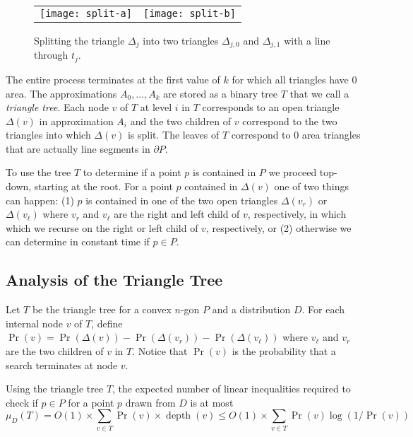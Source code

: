 \documentclass[charterfonts,lotsofwhite]{patmorin}
\newcommand{\boundary}{\partial}
\DeclareMathOperator{\depth}{depth}
\begin{document}
\begin{figure}
\begin{center}
\begin{tabular}{cc}
\texttt{[image: split-a]} & \texttt{[image: split-b]}
\end{tabular}
\end{center}
\caption{Splitting the triangle $\Delta_j$ into two triangles
$\Delta_{j,0}$ and $\Delta_{j,1}$ with a line through $t_j$.}
\end{figure}

The entire process terminates at the first value of $k$ for which all
triangles have 0 area.  The approximations $A_0,\ldots,A_k$ are stored
as a binary tree $T$ that we call a \emph{triangle tree}.  Each node
$v$ of $T$ at level $i$ in $T$ corresponds to an open triangle
$\Delta(v)$ in approximation $A_{i}$ and the two children of $v$
correspond to the two triangles into which $\Delta(v)$ is split.  The
leaves of $T$ correspond to 0 area triangles that are actually line
segments in $\boundary P$. 

To use the tree $T$ to determine if a point $p$ is contained in $P$ we
proceed top-down, starting at the root.  For a point $p$ contained in
$\Delta(v)$ one of two things can happen: (1) $p$ is contained in one
of the two open triangles $\Delta(v_r)$ or $\Delta(v_\ell)$ where
$v_r$ and $v_\ell$ are the right and left child of $v$, respectively,
in which which we recurse on the right or left child of $v$,
respectively, or (2) otherwise we can determine in constant time if
$p\in P$.

\subsection{Analysis of the Triangle Tree}

Let $T$ be the triangle tree for a convex $n$-gon $P$ and a
distribution $D$.  For each internal node $v$ of $T$, define
$\Pr(v)=\Pr(\Delta(v))-\Pr(\Delta(v_r))-\Pr(\Delta(v_\ell))$ where
$v_\ell$ and $v_r$ are the two children of $v$ in $T$.  Notice that
$\Pr(v)$ is the probability that a search terminates at node $v$.

\begin{lem}
Using the triangle tree $T$, the expected number of linear inequalities
required to check if $p\in P$ for a point $p$ drawn from $D$ is at
most
\[
     \mu_D(T) = O(1)\times \sum_{v\in T}\Pr(v)\times\depth (v)
      \le O(1)\times \sum_{v\in T}\Pr(v)\log(1/\Pr(v))
\]
\end{lem}
\end{document}
